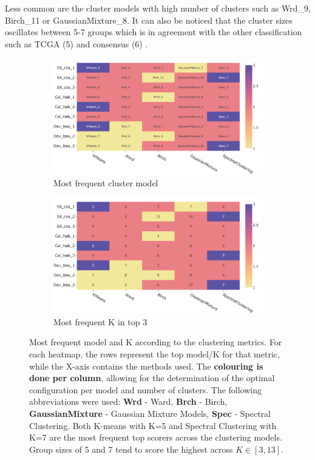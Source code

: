 Less common are the cluster models with high number of clusters such as Wrd\_9, Birch\_11 or GaussianMixture\_8. It can also be noticed that the cluster sizes oscillates between 5-7 groups which is in agreement with the other classification such as TCGA (5) and consensus (6) \citet{Robertson2017-mg,Kamoun2020-tj}.

\begin{figure}[H]
    \captionsetup{font=small}
    \centering
    \begin{subfigure}[!t]{0.98\textwidth}
        \includegraphics[width=\textwidth]{Sections/ClusteringAnalysis/Resources/cs_top3/top3_cs_gen_top3_heatmap_pca.png}
        \caption{Most frequent cluster model}
        \label{fig:cs:heatmap_gen}
    \end{subfigure}
    \centering
    \begin{subfigure}[!t]{0.98\textwidth}
        \includegraphics[width=\textwidth]{Sections/ClusteringAnalysis/Resources/cs_top3/top3_cs_size_top3_heatmap_pca.png}
        \caption{Most frequent K in top 3}
        \label{fig:cs:heatmap_cs}
    \end{subfigure}
    \caption{Most frequent model and K according to the clustering metrics. For each heatmap, the rows represent the top model/K for that metric, while the X-axis contains the methods used. The \textbf{colouring is done per column}, allowing for the determination of the optimal configuration per model and number of clusters. The following abbreviations were used: \textbf{Wrd} - Ward, \textbf{Brch} - Birch, \textbf{GaussianMixture} - Gaussian Mixture Models, \textbf{Spec} - Spectral Clustering. Both K-means with K=5 and Spectral Clustering with K=7 are the most frequent top scorers across the clustering models. Group sizes of 5 and 7 tend to score the highest across $K\in[3,13]$.}

\end{figure}
